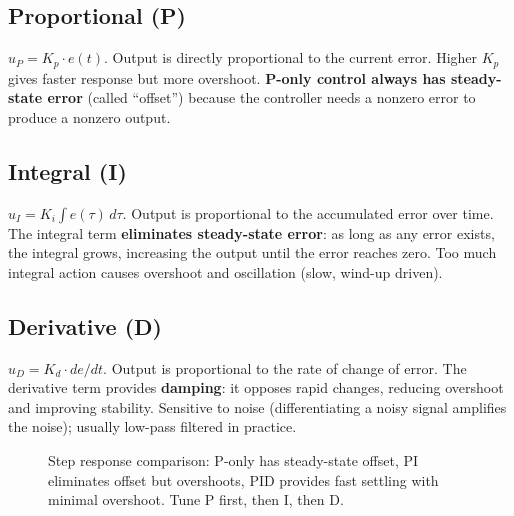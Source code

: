 \documentclass[11pt,letterpaper,twoside,openany]{book}
\begin{document}
\subsection{Proportional (P)}
$u_P = K_p \cdot e(t)$. Output is directly proportional to the current error. Higher $K_p$ gives faster response but more overshoot. \textbf{P-only control always has steady-state error} (called ``offset'') because the controller needs a nonzero error to produce a nonzero output.

\subsection{Integral (I)}
$u_I = K_i \int e(\tau)\, d\tau$. Output is proportional to the accumulated error over time. The integral term \textbf{eliminates steady-state error}: as long as any error exists, the integral grows, increasing the output until the error reaches zero. Too much integral action causes overshoot and oscillation (slow, wind-up driven).

\subsection{Derivative (D)}
$u_D = K_d \cdot de/dt$. Output is proportional to the rate of change of error. The derivative term provides \textbf{damping}: it opposes rapid changes, reducing overshoot and improving stability. Sensitive to noise (differentiating a noisy signal amplifies the noise); usually low-pass filtered in practice.

\begin{figure}[htbp]
\centering
{}
\caption{Step response comparison: P-only has steady-state offset, PI eliminates offset but overshoots, PID provides fast settling with minimal overshoot. Tune P first, then I, then D.}
\label{fig:pid_steps}
\end{figure}
\end{document}
